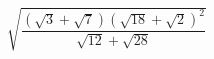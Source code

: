 \begin{ex}[type=calculate]
	\begin{condition}
		\( \sqrt{\dfrac{(\sqrt{3}+\sqrt{7})(\sqrt{18}+\sqrt{2})^2}{\sqrt{12}+\sqrt{28}}} \)
	\end{condition}
\end{ex}